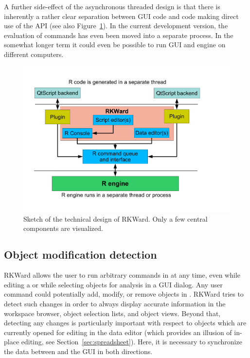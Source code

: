 A further side-effect of the asynchronous threaded design is that there is
inherently a rather clear separation between GUI code and code making direct use
of the  API (see also Figure~\ref{fig:design_sketch}). In the current development version, the evaluation
of  commands has even been moved into a separate process. In the somewhat longer term it could even
be possible to run GUI and  engine on different computers.

\begin{figure}[htp]
 \centering
 \includegraphics{../figures/design_sketch.pdf}
 \caption{Sketch of the technical design of RKWard. Only a few central components are visualized.}
 \label{fig:design_sketch}
\end{figure}

\subsection{Object modification detection}
\label{sec:technical_omd}
RKWard allows the user to run arbitrary commands in  at any time, even while
editing a  or while selecting objects for analysis in a GUI dialog. Any user
command could potentially add, modify, or remove objects in . RKWard tries to
detect such changes in order to always display accurate information in the
workspace browser, object selection lists, and object views. Beyond that,
detecting any changes is particularly important with respect to objects which
are currently opened for editing in the data editor (which provides an illusion
of in-place editing, see Section~\ref{sec:spreadsheet}). Here, it is necessary to synchronize
the data between  and the GUI in both directions.

